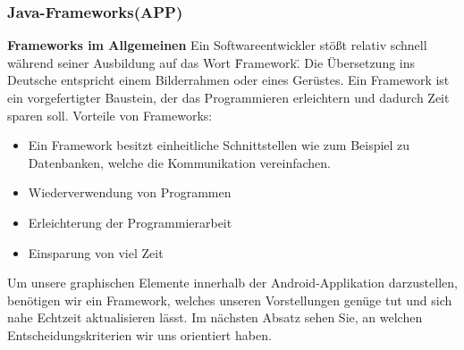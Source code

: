 \clearpage
\subsubsection{Java-Frameworks(APP)}
\textbf{Frameworks im Allgemeinen\newline}
Ein Softwareentwickler stößt relativ schnell während seiner Ausbildung
auf das Wort \"Framework\". Die Übersetzung ins Deutsche entspricht einem Bilderrahmen oder eines Gerüstes.
Ein Framework ist ein vorgefertigter Baustein, der das Programmieren erleichtern und dadurch Zeit sparen soll.
Vorteile von Frameworks:
\begin{itemize}
	\item Ein Framework besitzt einheitliche Schnittstellen wie zum Beispiel zu Datenbanken, welche die Kommunikation vereinfachen. 
	\item Wiederverwendung von Programmen 
	\item Erleichterung der Programmierarbeit
	\item Einsparung von viel Zeit
\end{itemize}
Um unsere graphischen Elemente innerhalb der Android-Applikation darzustellen, benötigen wir ein Framework, welches unseren Vorstellungen genüge tut und
sich nahe Echtzeit aktualisieren lässt. Im nächsten Absatz sehen Sie, an welchen Entscheidungskriterien wir uns orientiert haben. 
